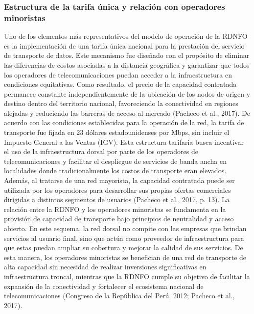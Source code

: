 \subsubsection{Estructura de la tarifa única y relación con operadores minoristas}
Uno de los elementos más representativos del modelo de operación de la RDNFO es la implementación de una tarifa única nacional para la prestación del servicio de transporte de datos. Este mecanismo fue diseñado con el propósito de eliminar las diferencias de costos asociadas a la distancia geográfica y garantizar que todos los operadores de telecomunicaciones puedan acceder a la infraestructura en condiciones equitativas. Como resultado, el precio de la capacidad contratada permanece constante independientemente de la ubicación de los nodos de origen y destino dentro del territorio nacional, favoreciendo la conectividad en regiones alejadas y reduciendo las barreras de acceso al mercado (Pacheco et al., 2017). 
De acuerdo con las condiciones establecidas para la operación de la red, la tarifa de transporte fue fijada en 23 dólares estadounidenses por Mbps, sin incluir el Impuesto General a las Ventas (IGV). Esta estructura tarifaria busca incentivar el uso de la infraestructura dorsal por parte de los operadores de telecomunicaciones y facilitar el despliegue de servicios de banda ancha en localidades donde tradicionalmente los costos de transporte eran elevados. Además, al tratarse de una red mayorista, la capacidad contratada puede ser utilizada por los operadores para desarrollar sus propias ofertas comerciales dirigidas a distintos segmentos de usuarios (Pacheco et al., 2017, p. 13). 
La relación entre la RDNFO y los operadores minoristas se fundamenta en la provisión de capacidad de transporte bajo principios de neutralidad y acceso abierto. En este esquema, la red dorsal no compite con las empresas que brindan servicios al usuario final, sino que actúa como proveedor de infraestructura para que estas puedan ampliar su cobertura y mejorar la calidad de sus servicios. De esta manera, los operadores minoristas se benefician de una red de transporte de alta capacidad sin necesidad de realizar inversiones significativas en infraestructura troncal, mientras que la RDNFO cumple su objetivo de facilitar la expansión de la conectividad y fortalecer el ecosistema nacional de telecomunicaciones (Congreso de la República del Perú, 2012; Pacheco et al., 2017). 

